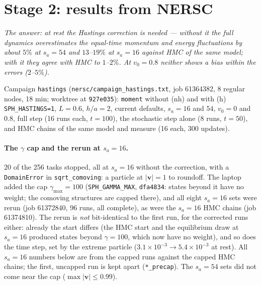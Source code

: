 \documentclass[11pt,aps,preprint,nofootinbib,superscriptaddress,tightenlines]{revtex4-2}
\let\oldparagraph\paragraph
\renewcommand{\paragraph}{\par\bigskip\oldparagraph}
\begin{document}
\section{Stage 2: results from NERSC}
\label{sec:nersc2}

\emph{The answer: at rest the Hastings correction is needed --- without it the full dynamics overestimates the equal-time momentum and energy
fluctuations by about $5\%$ at $s_a=54$ and $13$--$19\%$ at $s_a=16$ against HMC of the same model; with it they agree with HMC to $1$--$2\%$.  At $v_0=0.8$
neither shows a bias within the errors ($2$--$5\%$).}

Campaign \texttt{hastings} (\texttt{nersc/campaign\_hastings.txt}, job 61364382, 8 regular nodes, 18 min; worktree at \texttt{927e035}): \texttt{moment} without
(nh) and with (h) \texttt{SPH\_HASTINGS=1}, $L=0.6$, $h/a=2$, current defaults, $s_a=16$ and $54$, $v_0=0$ and $0.8$, full step (16 runs each, $t=100$), the
stochastic step alone (8 runs, $t=50$), and HMC chains of the same model and measure (16 each, 300 updates).

\paragraph{The $\gamma$ cap and the rerun at $s_a=16$.}  20 of the 256 tasks stopped, all at $s_a=16$ without the correction, with a
\texttt{DomainError} in \texttt{sqrt\_comoving}: a particle at $|\bm v|=1$ to roundoff.  The laptop added the cap $\gamma_{\max}=100$ (\texttt{SPH\_GAMMA\_MAX},
\texttt{dfa4834}: states beyond it have no weight; the comoving structures are capped there), and all eight $s_a=16$ sets were rerun (job 61372840, 96
runs, all complete), as were the $s_a=16$ HMC chains (job 61374810).  The rerun is \emph{not} bit-identical to the first run, for the corrected runs
either: already the start differs (the HMC start and the equilibrium draw at $s_a=16$ produced states beyond $\gamma=100$, which now have no weight),
and so does the time step, set by the extreme particle ($3.1\times10^{-3}\to5.4\times10^{-3}$ at rest).  All $s_a=16$ numbers below are from the capped
runs against the capped HMC chains; the first, uncapped run is kept apart (\texttt{*\_precap}).  The $s_a=54$ sets did not come near the cap
($\max|\bm v|\le0.99$).
\end{document}
